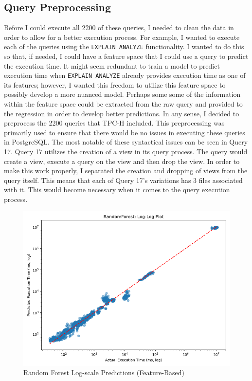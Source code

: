 \documentclass[sigconf]{acmart}
\begin{document}
\subsection{Query Preprocessing}
Before I could execute all 2200 of these queries, I needed to clean the data in order to allow for a better execution process.
For example, I wanted to execute each of the queries using the \texttt{EXPLAIN ANALYZE} functionality. I wanted to do this so that,
if needed, I could have a feature space that I could use a query to predict the execution time. It might seem redundant to train a model to predict execution time when
\texttt{EXPLAIN ANALYZE} already provides execution time as one of its features; however, I wanted this freedom to utilize this feature space to
possibly develop a more nuanced model. Perhaps some some of the information within the feature space could be extracted from the raw query and provided to the regression
in order to develop better predictions. In any sense, I decided to preprocess the 2200 queries that TPC-H included. This preprocessing was primarily used to ensure that
there would be no issues in executing these queries in PostgreSQL. The most notable of these syntactical issues can be seen in Query 17. Query 17 utilizes the creation of a
view in its query process. The query would create a view, execute a query on the view and then drop the view. In order to make this work properly, I separated the creation and dropping
of views from the query itself. This means that each of Query 17's variations has 3 files associated with it. This would become necessary when it comes to the query execution process.

\begin{figure}[h!]
  \centering
  \includegraphics[width=\linewidth]{feature_based_rf/logscale.png}
  \caption{Random Forest Log-scale Predictions (Feature-Based)}
  \label{fig:rf-feature-log}
\end{figure}
\end{document}
